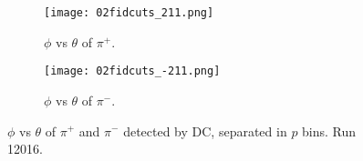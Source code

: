     \begin{figure}
        \begin{subfigure}[b]{\textwidth}
            \texttt{[image: 02fidcuts\_211.png]}
            \caption{$\phi$ vs $\theta$ of $\pi^+$.}
            \label{fig::20.02::fiducial_cuts_pid211}
        \end{subfigure}
        \begin{subfigure}[b]{\textwidth}
            \texttt{[image: 02fidcuts\_-211.png]}
            \caption{$\phi$ vs $\theta$ of $\pi^-$.}
            \label{fig::20.02::fiducial_cuts_pid-211}
        \end{subfigure}

        \caption[$\phi$ vs $\theta$ of $\pi^+$ and $\pi^-$, separated in $p$ bins.]
        {$\phi$ vs $\theta$ of $\pi^+$ and $\pi^-$ detected by DC, separated in $p$ bins.
        Run 12016.}
        \label{fig::20.02::fiducial_cuts_pions}
    \end{figure}

    \pagebreak
